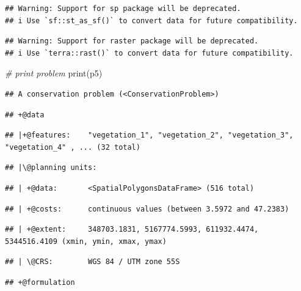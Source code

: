 \documentclass[
  12pt,
]{book}
\newenvironment{Shaded}{\begin{snugshade}}{\end{snugshade}}
\newcommand{\CommentTok}[1]{\textcolor[rgb]{0.56,0.35,0.01}{\textit{#1}}}
\newcommand{\FunctionTok}[1]{\textcolor[rgb]{0.00,0.00,0.00}{#1}}
\newcommand{\NormalTok}[1]{#1}
\begin{document}
\begin{verbatim}
## Warning: Support for sp package will be deprecated.
## i Use `sf::st_as_sf()` to convert data for future compatibility.
\end{verbatim}

\begin{verbatim}
## Warning: Support for raster package will be deprecated.
## i Use `terra::rast()` to convert data for future compatibility.
\end{verbatim}

\begin{Shaded}
\begin{Highlighting}[]
\CommentTok{\# print problem}
\FunctionTok{print}\NormalTok{(p5)}
\end{Highlighting}
\end{Shaded}

\begin{verbatim}
## A conservation problem (<ConservationProblem>)
\end{verbatim}

\begin{verbatim}
## +@data
\end{verbatim}

\begin{verbatim}
## |+@features:    "vegetation_1", "vegetation_2", "vegetation_3", "vegetation_4" , ... (32 total)
\end{verbatim}

\begin{verbatim}
## |\@planning units:
\end{verbatim}

\begin{verbatim}
## | +@data:       <SpatialPolygonsDataFrame> (516 total)
\end{verbatim}

\begin{verbatim}
## | +@costs:      continuous values (between 3.5972 and 47.2383)
\end{verbatim}

\begin{verbatim}
## | +@extent:     348703.1831, 5167774.5993, 611932.4474, 5344516.4109 (xmin, ymin, xmax, ymax)
\end{verbatim}

\begin{verbatim}
## | \@CRS:        WGS 84 / UTM zone 55S
\end{verbatim}

\begin{verbatim}
## +@formulation
\end{verbatim}
\end{document}
